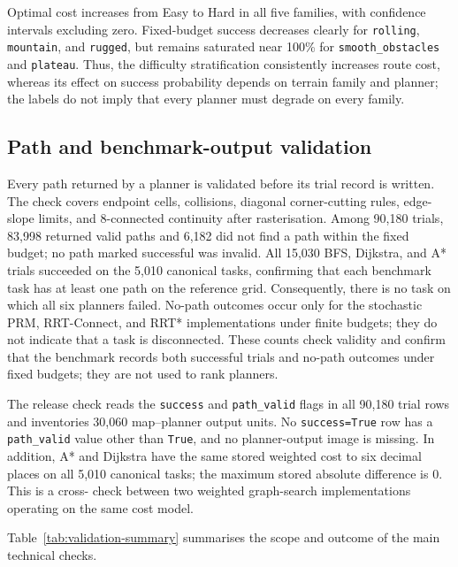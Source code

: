 \documentclass[11pt]{article}
\begin{document}
Optimal cost increases from Easy to Hard in all five families, with confidence
intervals excluding zero. Fixed-budget success decreases clearly for
\texttt{rolling}, \texttt{mountain}, and \texttt{rugged}, but remains saturated
near 100\% for \texttt{smooth\_obstacles} and \texttt{plateau}. Thus, the
difficulty stratification consistently increases route cost, whereas its effect
on success probability depends on terrain family and planner; the labels do not
imply that every planner must degrade on every family.

\subsection{Path and benchmark-output validation}

Every path returned by a planner is validated before its trial record is
written. The check covers endpoint cells, collisions, diagonal corner-cutting
rules, edge-slope limits, and 8-connected continuity after rasterisation. Among
90,180 trials, 83,998 returned valid paths and 6,182 did not find a path within
the fixed budget; no path marked successful was invalid. All 15,030 BFS,
Dijkstra, and A* trials succeeded on the 5,010 canonical tasks, confirming that
each benchmark task has at least one path on the reference grid. Consequently,
there is no task on which all six planners failed. No-path outcomes occur only
for the stochastic PRM, RRT-Connect, and RRT* implementations under finite
budgets; they do not indicate that a task is disconnected. These counts check
validity and confirm that the benchmark records both successful trials and
no-path outcomes under fixed budgets; they are not used to rank planners.

The release check reads the \texttt{success} and \texttt{path\_valid} flags in
all 90,180 trial rows and inventories 30,060 map--planner output units. No
\texttt{success=True} row has a \texttt{path\_valid} value other than
\texttt{True}, and no planner-output image is missing. In addition, A* and
Dijkstra have the same stored weighted cost to six decimal places on all 5,010
canonical tasks; the maximum stored absolute difference is 0. This is a cross-
check between two weighted graph-search implementations operating on the same
cost model.

Table~\ref{tab:validation-summary} summarises the scope and outcome of the main
technical checks.
\end{document}
